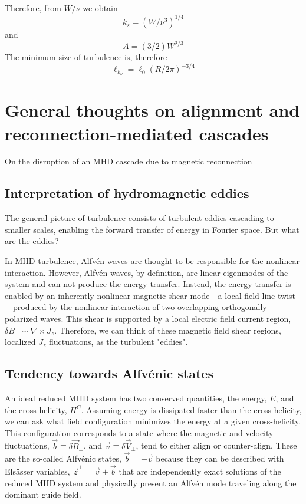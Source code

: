 \documentclass[usenatbib,twocolumn]{aastex63}
\begin{document}
\begin{appendix}
Therefore, from $W/\nu$ we obtain
\begin{equation}
k_s = (W/\nu^3)^{1/4}
\end{equation}
and
\begin{equation}
    A = (3/2) W^{2/3}
\end{equation}
The minimum size of turbulence is, therefore
\begin{equation}
    \ell_{k_\nu} = \ell_0 (R/2\pi)^{-3/4}
\end{equation}



\section{General thoughts on alignment and reconnection-mediated cascades}
On the disruption of an MHD cascade due to magnetic reconnection


\subsection{Interpretation of hydromagnetic eddies}

The general picture of turbulence consists of turbulent eddies cascading to smaller scales, enabling the forward transfer of energy in Fourier space. 
But what are the eddies?

In MHD turbulence, Alfv\'en waves are thought to be responsible for the nonlinear interaction.
However, Alfv\'en waves, by definition, are linear eigenmodes of the system and can not produce the energy transfer.
Instead, the energy transfer is enabled by an inherently nonlinear magnetic shear mode---a local field line twist---produced by the nonlinear interaction of two overlapping orthogonally polarized waves.
This shear is supported by a local electric field current region, $\delta B_\perp \sim \nabla \times J_z$.
Therefore, we can think of these magnetic field shear regions, localized $J_z$ fluctuations, as the turbulent "eddies".

\subsection{Tendency towards Alfv\'enic states }


An ideal reduced MHD system has two conserved quantities, the energy, $E$, and the cross-helicity, $H^C$.
Assuming energy is dissipated faster than the cross-helicity, we can ask what field configuration minimizes the energy at a given cross-helicity.
This configuration corresponds to a state where the magnetic and velocity fluctuations, $\vec{b}\equiv \delta \vec{B}_\perp$, and $\vec{v}\equiv \delta \vec{V}_\perp$, tend to either align or counter-align.
These are the so-called Alfv\'enic  states, $\vec{b} = \pm \vec{v}$ because they can be described with Els\"asser  variables, $\vec{z}^\pm = \vec{v} \pm \vec{b}$ that are independently exact solutions of the reduced MHD system and physically present an Alfv\'en mode traveling along the dominant guide field.




\end{appendix}
\end{document}
